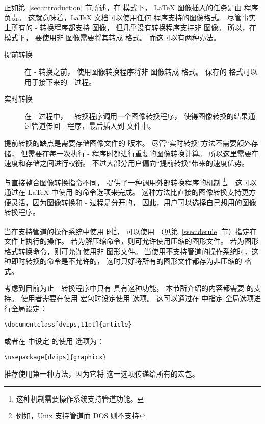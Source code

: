 正如第~\ref{sec:introduction} 节所述，在  模式下，
\LaTeX{} 图像插入的任务是由  程序负责。
这就意味着，\LaTeX{} 文档可以使用任何  程序支持的图像格式。
尽管事实上所有的 - 转换程序都支持  图像，
但几乎没有转换程序支持非  图像。
所以，在  模式下，
要使用非  图像需要将其转成  格式。
而这可以有两种办法。
\begin{description}
	\item[提前转换] 在 - 转换之前，
	使用图像转换程序将非 图像转成 格式。
	保存的  格式可以用于接下来的 - 过程。
	
	\item[实时转换] 在 - 过程中，
	- 转换程序调用一个图像转换程序，
	使得图像转换的结果通过管道传回 - 程序，最后插入到  文件中。
\end{description}
提前转换的缺点是需要存储图像文件的  版本。
尽管“实时转换”方法不需要额外存储，
但需要在每一次执行 - 程序时都进行重复的图像转换计算。
所以这里需要在速度和存储之间进行权衡。
不过大部分用户偏向“提前转换”带来的速度优势。

与直接整合图像转换指令不同， 提供了一种调用外部转换程序的机制
\footnote{
	这种机制需要操作系统支持管道功能。}。
这可以通过在 \LaTeX{} 中使用  的命令选项来完成。
这种方法比直接的图像转换支持更方便灵活，因为图像转换和 - 过程是分开的，
因此，用户可以选择自己想用的图像转换程序。

当在支持管道的操作系统中使用  时\footnote{
	例如，Unix 支持管道而 DOS 则不支持}，
可以使用  （见第~\ref{ssec:derule} 节）指定在文件上执行的操作。
若为解压缩命令，则可允许使用压缩的图形文件。
若为图形格式转换命令，则可允许使用非  图形文件。
当使用不支持管道的操作系统时，这种即时转换的命令是不允许的，
这时只好将所有的图形文件都存为非压缩的  格式。

考虑到目前为止 - 转换程序中只有  具有这种功能，
本节所介绍的内容都需要  的支持。
使用者需要在使用  宏包时设定使用  选项。
这可以通过在  中指定  全局选项进行全局设定：
\begin{lstlisting}
\documentclass[dvips,11pt]{article}
\end{lstlisting}
或者在  中设定  的使用  选项为：
\begin{lstlisting}
\usepackage[dvips]{graphicx}
\end{lstlisting}
推荐使用第一种方法，因为它将  这一选项传递给所有的宏包。



